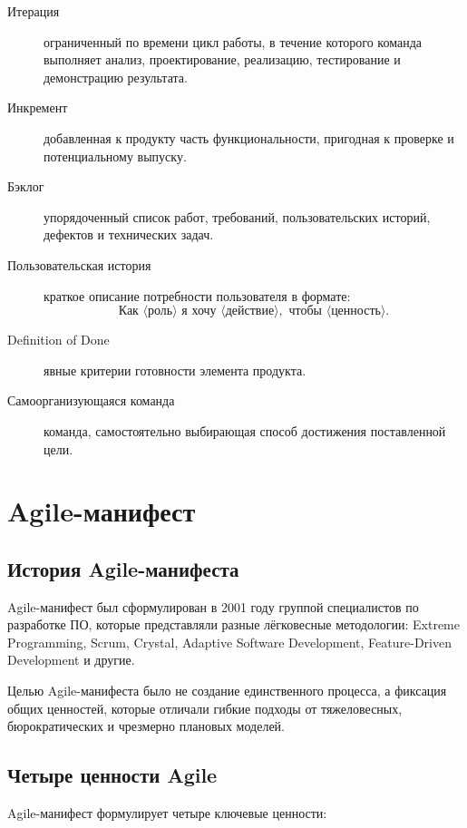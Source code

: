 \documentclass[12pt,a4paper]{article}
\begin{document}
\begin{description}
    \item[Итерация] ограниченный по времени цикл работы, в течение которого команда выполняет анализ, проектирование, реализацию, тестирование и демонстрацию результата.
    \item[Инкремент] добавленная к продукту часть функциональности, пригодная к проверке и потенциальному выпуску.
    \item[Бэклог] упорядоченный список работ, требований, пользовательских историй, дефектов и технических задач.
    \item[Пользовательская история] краткое описание потребности пользователя в формате:
    \[
    \text{Как } \langle \text{роль} \rangle
    \text{ я хочу } \langle \text{действие} \rangle,
    \text{ чтобы } \langle \text{ценность} \rangle.
    \]
    \item[Definition of Done] явные критерии готовности элемента продукта.
    \item[Самоорганизующаяся команда] команда, самостоятельно выбирающая способ достижения поставленной цели.
\end{description}

\section{Agile-манифест}

\subsection{История Agile-манифеста}

Agile-манифест был сформулирован в 2001 году группой специалистов по разработке ПО, которые представляли разные лёгковесные методологии: Extreme Programming, Scrum, Crystal, Adaptive Software Development, Feature-Driven Development и другие.

Целью Agile-манифеста было не создание единственного процесса, а фиксация общих ценностей, которые отличали гибкие подходы от тяжеловесных, бюрократических и чрезмерно плановых моделей.

\subsection{Четыре ценности Agile}

Agile-манифест формулирует четыре ключевые ценности:
\end{document}
